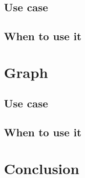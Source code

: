 \documentclass{CRPITStyle}
\begin{document}
\subsection{Use case}

\subsection{When to use it}


\section{Graph}

\subsection{Use case}

\subsection{When to use it}

\section{Conclusion}




\end{document}
